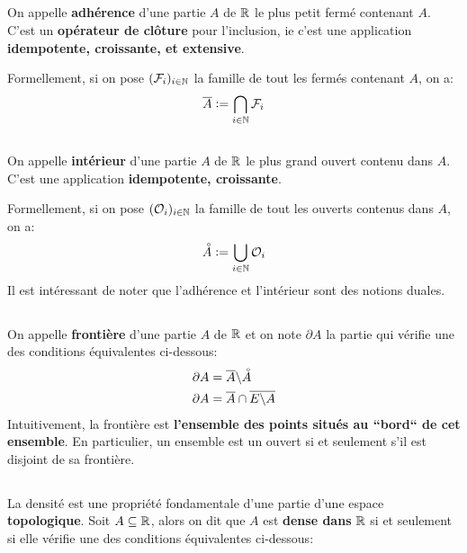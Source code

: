\subsection*{}
On appelle \textbf{adhérence} d'une partie \(A\) de \(\mathbb{R}\) le plus petit fermé contenant \(A\). C'est un \textbf{opérateur de clôture} pour l'inclusion, ie c'est une application \textbf{idempotente, croissante, et extensive}.\<

Formellement, si on pose \((\mathcal{F}_i)_{i \in \mathbb{N}}\) la famille de tout les fermés contenant \(A\), on a:
\[
    \overline{A} := \bigcap_{i \in \mathbb{N}} \mathcal{F}_i
\]

\subsection*{}
On appelle \textbf{intérieur} d'une partie \(A\) de \(\mathbb{R}\) le plus grand ouvert contenu dans \(A\). C'est une application \textbf{idempotente, croissante}.\<

Formellement, si on pose \((\mathcal{O}_i)_{i \in \mathbb{N}}\) la famille de tout les ouverts contenus dans \(A\), on a:
\[
    \accentset{\circ}{A} := \bigcup_{i \in \mathbb{N}} \mathcal{O}_i
\]
Il est intéressant de noter que l'adhérence et l'intérieur sont des notions duales.


\subsection*{}
On appelle \textbf{frontière} d'une partie \(A\) de \(\mathbb{R}\) et on note \(\partial A\) la partie qui vérifie une des conditions équivalentes ci-dessous:
\begin{align*}
    \partial A &= \overline{A} \backslash \accentset{\circ}{A} \\
    \partial A &= \overline{A} \cap \overline{E \backslash A} \\    
\end{align*}
Intuitivement, la frontière est \textbf{l'ensemble des points situés au ``bord`` de cet ensemble}.\+
En particulier, un ensemble est un ouvert si et seulement s'il est disjoint de sa frontière.

\subsection*{}
La densité est une propriété fondamentale d'une partie d'une espace \textbf{topologique}.
Soit \(A \subseteq \mathbb{R}\), alors on dit que \(A\) est \textbf{dense dans} \(\mathbb{R}\) si et seulement si elle vérifie une des conditions équivalentes ci-dessous:
\begin{center}
\end{center}


